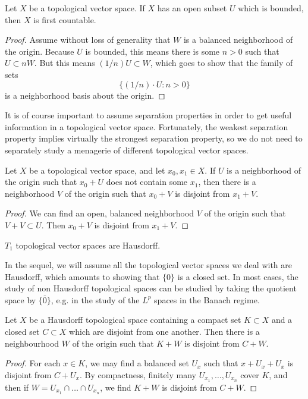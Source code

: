 \begin{theorem}
    Let $X$ be a topological vector space. If $X$ has an open subset $U$ which is bounded, then $X$ is first countable.
\end{theorem}
\begin{proof}
    Assume without loss of generality that $W$ is a balanced neighborhood of the origin. Because $U$ is bounded, this means there is some $n > 0$ such that $U \subset n W$. But this means $(1/n) U \subset W$, which goes to show that the family of sets
    \[ \{ (1/n) \cdot U : n > 0 \} \]
    is a neighborhood basis about the origin.
\end{proof}

It is of course important to assume separation properties in order to get useful information in a topological vector space. Fortunately, the weakest separation property implies virtually the strongest separation property, so we do not need to separately study a menagerie of different topological vector spaces.

\begin{theorem}
    Let $X$ be a topological vector space, and let $x_0,x_1 \in X$. If $U$ is a neighborhood of the origin such that $x_0 + U$ does not contain some $x_1$, then there is a neighborhood $V$ of the origin such that $x_0 + V$ is disjoint from $x_1 + V$.
\end{theorem}
\begin{proof}
    We can find an open, balanced neighborhood $V$ of the origin such that $V + V \subset U$. Then $x_0 + V$ is disjoint from $x_1 + V$.
\end{proof}

\begin{corollary}
    $T_1$ topological vector spaces are Hausdorff.
\end{corollary}

In the sequel, we will assume all the topological vector spaces we deal with are Hausdorff, which amounts to showing that $\{ 0 \}$ is a closed set. In most cases, the study of non Hausdorff topological spaces can be studied by taking the quotient space by $\overline{\{ 0 \}}$, e.g. in the study of the $L^p$ spaces in the Banach regime.

\begin{corollary}
    Let $X$ be a Hausdorff topological space containing a compact set $K \subset X$ and a closed set $C \subset X$ which are disjoint from one another. Then there is a neighbourhood $W$ of the origin such that $K + W$ is disjoint from $C + W$.
\end{corollary}
\begin{proof}
    For each $x \in K$, we may find a balanced set $U_x$ such that $x + U_x + U_x$ is disjoint from $C + U_x$. By compactness, finitely many $U_{x_1}, \dots, U_{x_n}$ cover $K$, and then if $W = U_{x_1} \cap \dots \cap U_{x_n}$, we find $K + W$ is disjoint from $C + W$.
\end{proof}

